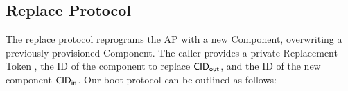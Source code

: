 \subsection{Replace Protocol}

The replace protocol reprograms the AP with a new Component, overwriting a previously provisioned Component. The caller provides a private Replacement Token \rtok, the ID of the component to replace $\mathsf{CID}_\textsf{out}$, and the ID of the new component $\mathsf{CID}_\textsf{in}$.  Our boot protocol can be outlined as follows: %


